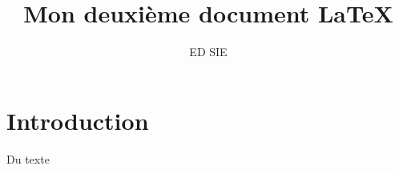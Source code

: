 \documentclass[10pt,a4paper]{article}
\title{Mon deuxième document \LaTeX}
\author{ED SIE}
\begin{document}
\maketitle
\tableofcontents

\section{Introduction}
Du texte 
\end{document}
